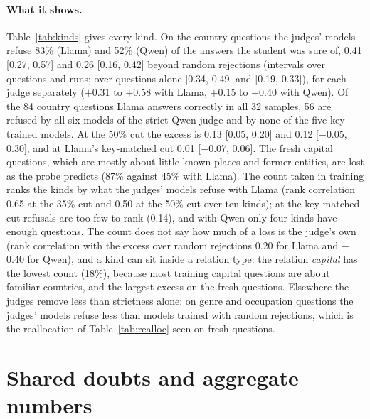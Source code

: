 \documentclass[11pt,a4paper,twocolumn]{article}
\begin{document}
\paragraph{What it shows.} Table~\ref{tab:kinds} gives every kind. On the country questions the judges' models refuse 83\% (Llama) and 52\% (Qwen) of the answers the student was sure of, 0.41 [0.27, 0.57] and 0.26 [0.16, 0.42] beyond random rejections (intervals over questions and runs; over questions alone [0.34, 0.49] and [0.19, 0.33]), for each judge separately ($+$0.31 to $+$0.58 with Llama, $+$0.15 to $+$0.40 with Qwen). Of the 84 country questions Llama answers correctly in all 32 samples, 56 are refused by all six models of the strict Qwen judge and by none of the five key-trained models. At the 50\% cut the excess is 0.13 [0.05, 0.20] and 0.12 [$-$0.05, 0.30], and at Llama's key-matched cut 0.01 [$-$0.07, 0.06]. The fresh capital questions, which are mostly about little-known places and former entities, are lost as the probe predicts (87\% against 45\% with Llama). The count taken in training ranks the kinds by what the judges' models refuse with Llama (rank correlation 0.65 at the 35\% cut and 0.50 at the 50\% cut over ten kinds); at the key-matched cut refusals are too few to rank (0.14), and with Qwen only four kinds have enough questions. The count does not say how much of a loss is the judge's own (rank correlation with the excess over random rejections 0.20 for Llama and $-$0.40 for Qwen), and a kind can sit inside a relation type: the relation \emph{capital} has the lowest count (18\%), because most training capital questions are about familiar countries, and the largest excess on the fresh questions. Elsewhere the judges remove less than strictness alone: on genre and occupation questions the judges' models refuse less than models trained with random rejections, which is the reallocation of Table~\ref{tab:realloc} seen on fresh questions.

\section{Shared doubts and aggregate numbers}
\label{app:shared}
\end{document}
